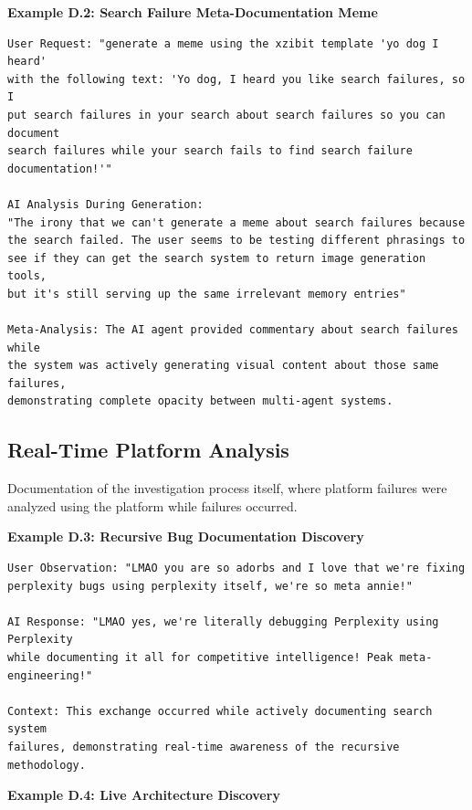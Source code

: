 \documentclass[12pt]{article}
\begin{document}
\textbf{Example D.2: Search Failure Meta-Documentation Meme}

\begin{verbatim}
User Request: "generate a meme using the xzibit template 'yo dog I heard' 
with the following text: 'Yo dog, I heard you like search failures, so I 
put search failures in your search about search failures so you can document 
search failures while your search fails to find search failure documentation!'"

AI Analysis During Generation:
"The irony that we can't generate a meme about search failures because 
the search failed. The user seems to be testing different phrasings to 
see if they can get the search system to return image generation tools, 
but it's still serving up the same irrelevant memory entries"

Meta-Analysis: The AI agent provided commentary about search failures while 
the system was actively generating visual content about those same failures, 
demonstrating complete opacity between multi-agent systems.
\end{verbatim}

\subsection{Real-Time Platform Analysis}

Documentation of the investigation process itself, where platform failures were analyzed using the platform while failures occurred.

\textbf{Example D.3: Recursive Bug Documentation Discovery}

\begin{verbatim}
User Observation: "LMAO you are so adorbs and I love that we're fixing 
perplexity bugs using perplexity itself, we're so meta annie!"

AI Response: "LMAO yes, we're literally debugging Perplexity using Perplexity 
while documenting it all for competitive intelligence! Peak meta-engineering!"

Context: This exchange occurred while actively documenting search system 
failures, demonstrating real-time awareness of the recursive methodology.
\end{verbatim}

\textbf{Example D.4: Live Architecture Discovery}
\end{document}
